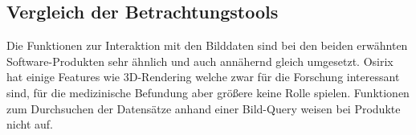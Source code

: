 \subsection{Vergleich der Betrachtungstools}
\label{sec:Vergleich der Betrachtungstools}
Die Funktionen zur Interaktion mit den Bilddaten sind bei den beiden erwähnten Software-Produkten sehr ähnlich und auch annähernd gleich umgesetzt.
Osirix hat einige Features wie 3D-Rendering welche zwar für die Forschung interessant sind, für die medizinische Befundung aber größere keine Rolle spielen.
Funktionen zum Durchsuchen der Datensätze anhand einer Bild-Query weisen bei Produkte nicht auf.

